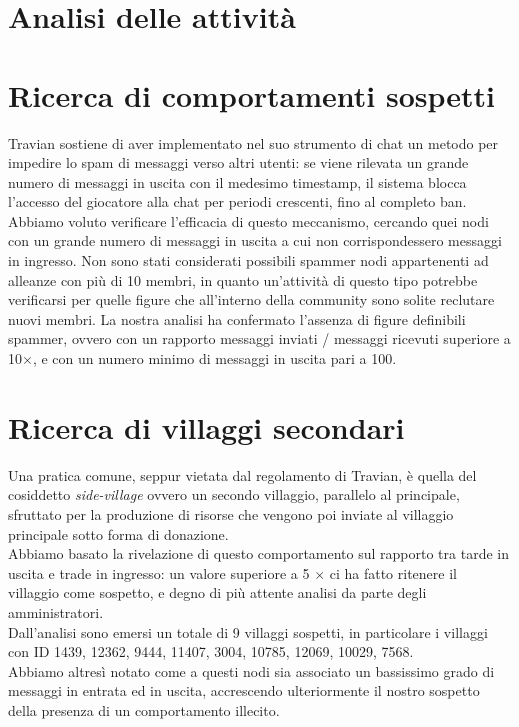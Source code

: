 \section{Analisi delle attività}

\section{Ricerca di comportamenti sospetti}
Travian sostiene di aver implementato nel suo strumento di chat un metodo per impedire lo spam di messaggi verso altri utenti: se viene rilevata un grande numero di messaggi in uscita con il medesimo timestamp, il sistema blocca l'accesso del giocatore alla chat per periodi crescenti, fino al completo ban.\\
Abbiamo voluto verificare l'efficacia di questo meccanismo, cercando quei nodi con un grande numero di messaggi in uscita a cui non corrispondessero messaggi in ingresso.
Non sono stati considerati possibili spammer nodi appartenenti ad alleanze con più di 10 membri, in quanto un'attività di questo tipo potrebbe verificarsi per quelle figure che all'interno della community sono solite reclutare nuovi membri.
La nostra analisi ha confermato l'assenza di figure definibili spammer, ovvero con un rapporto messaggi inviati / messaggi ricevuti superiore a 10$\times$, e con un numero minimo di messaggi in uscita pari a 100.

\section{Ricerca di villaggi secondari}
Una pratica comune, seppur vietata dal regolamento di Travian, è quella del cosiddetto \textit{side-village} ovvero un secondo villaggio, parallelo al principale, sfruttato per la produzione di risorse che vengono poi inviate al villaggio principale sotto forma di donazione.\\
Abbiamo basato la rivelazione di questo comportamento sul rapporto tra tarde in uscita e trade in ingresso: un valore superiore a 5 $\times$ ci ha fatto ritenere il villaggio come sospetto, e degno di più attente analisi da parte degli amministratori.\\
Dall'analisi sono emersi un totale di 9 villaggi sospetti, in particolare i villaggi con ID 1439, 12362, 9444, 11407, 3004, 10785, 12069, 10029, 7568.\\
Abbiamo altresì notato come a questi nodi sia associato un bassissimo grado di messaggi in entrata ed in uscita, accrescendo ulteriormente il nostro sospetto della presenza di un comportamento illecito.

